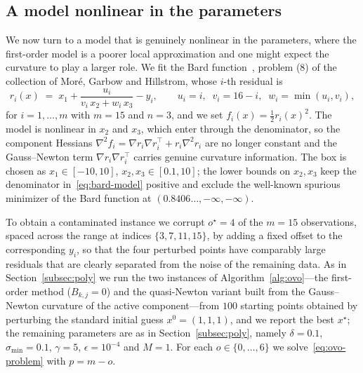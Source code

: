
\subsection{A model nonlinear in the parameters}\label{subsec:bard}

We now turn to a model that is genuinely nonlinear in the parameters, where
the first-order model is a poorer local approximation and one might expect the
curvature to play a larger role. We fit the Bard function~\cite{MGH}, problem
(8) of the collection of Mor\'e, Garbow and Hillstrom, whose $i$-th residual is
\begin{equation}\label{eq:bard-model}
  r_i(x) \;=\; x_1 + \frac{u_i}{v_i\,x_2 + w_i\,x_3} - y_i,
  \qquad u_i = i,\;\; v_i = 16-i,\;\; w_i = \min(u_i,v_i),
\end{equation}
for $i=1,\dots,m$ with $m=15$ and $n=3$, and we set
$f_i(x)=\tfrac12 r_i(x)^2$. The model is nonlinear in $x_2$ and $x_3$, which
enter through the denominator, so the component Hessians
$\nabla^2 f_i = \nabla r_i\nabla r_i^{\!\top} + r_i\nabla^2 r_i$ are no longer
constant and the Gauss--Newton term $\nabla r_i\nabla r_i^{\!\top}$ carries
genuine curvature information. The box is chosen as
$x_1\in[-10,10]$, $x_2,x_3\in[0.1,10]$; the lower bounds on $x_2,x_3$ keep the
denominator in~\eqref{eq:bard-model} positive and exclude the well-known
spurious minimizer of the Bard function at $(0.8406\dots,-\infty,-\infty)$.

To obtain a contaminated instance we corrupt $o^\star=4$ of the $m=15$
observations, spaced across the range at indices $\{3,7,11,15\}$, by adding a
fixed offset to the corresponding $y_i$, so that the four perturbed points have
comparably large residuals that are clearly separated from the noise of the
remaining data. As in Section~\ref{subsec:poly} we run the two instances of
Algorithm~\ref{alg:ovo}---the first-order method ($B_{k,j}=0$) and the
quasi-Newton variant built from the Gauss--Newton curvature of the active
component---from $100$ starting points obtained by perturbing the standard
initial guess $x^0=(1,1,1)$, and we report the best $x^\star$; the remaining
parameters are as in Section~\ref{subsec:poly}, namely
$\delta=0.1$, $\sigma_{\min}=0.1$, $\gamma=5$, $\epsilon=10^{-4}$ and $M=1$.
For each $o\in\{0,\dots,6\}$ we solve~\eqref{eq:ovo-problem} with $p=m-o$.


